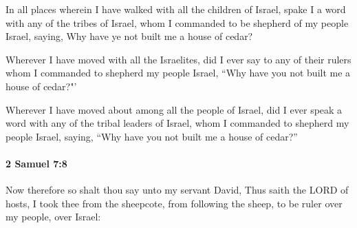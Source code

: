 			\begin{versebox}
					\item[BHS] 
					\item[ASV] In all places wherein I have walked with all the children of Israel, spake I a word with any of the tribes of Israel, whom I commanded to be shepherd of my people Israel, saying, Why have ye not built me a house of cedar?
					\item[NIV] Wherever I have moved with all the Israelites, did I ever say to any of their rulers whom I commanded to shepherd my people Israel, “Why have you not built me a house of cedar?"’
					\item[NRSV] Wherever I have moved about among all the people of Israel, did I ever speak a word with any of the tribal leaders of Israel, whom I commanded to shepherd my people Israel, saying, “Why have you not built me a house of cedar?”
			\end{versebox}

		\paragraph{2 Samuel 7:8} %
			\label{2SAMUEL-7-8}

			Now therefore so shalt thou say unto my servant David, Thus saith the LORD of hosts, I took thee from the sheepcote, from following the sheep, to be ruler over my people, over Israel:

